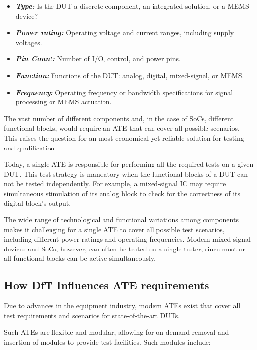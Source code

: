 \begin{itemize}[topsep=8pt,itemsep=4pt,partopsep=4pt, parsep=4pt]
    \item \textbf{\emph{Type:}} Is the \ac{DUT} a discrete component, an integrated solution, or a MEMS device?
    \item \textbf{\emph{Power rating:}} Operating voltage and current ranges, including supply voltages.
    \item \textbf{\emph{Pin Count:}} Number of \ac{I/O}, control, and power pins.
    \item \textbf{\emph{Function:}} Functions of the \ac{DUT}: analog, digital, mixed-signal, or MEMS.
    \item \textbf{\emph{Frequency:}} Operating frequency or bandwidth specifications for signal processing or MEMS actuation.
\end{itemize}

The vast number of different components and, in the case of \ac{SoC}s, different
functional blocks, would require an \ac{ATE} that can cover all possible
scenarios.
This raises the question for an most economical yet reliable solution
for testing and qualification.

Today, a single \ac{ATE} is responsible for performing
all the required tests on a given \ac{DUT}.
This test strategy is mandatory when the functional blocks of a \ac{DUT} can
not be tested independently.
For example, a mixed-signal \ac{IC} may require simultaneous stimulation of its
analog block to check for the correctness of its digital block's output.

The wide range of technological and functional variations among components makes it challenging 
for a single \ac{ATE} to cover all possible test scenarios, including different power ratings 
and operating frequencies. Modern mixed-signal devices and \ac{SoC}s, however, can often be 
tested on a single tester, since most or all functional blocks can be active simultaneously.

\subsection{How \acs{DfT} Influences \acs{ATE} requirements}
\label{subsec:properties-of-modern-ate}

Due to advances in the equipment
industry, modern \ac{ATE}s exist that cover all
test requirements and scenarios for state-of-the-art \acp{DUT}.

Such \ac{ATE}s are flexible and modular, allowing for on-demand
removal and insertion of modules to provide test facilities.
Such modules include:

